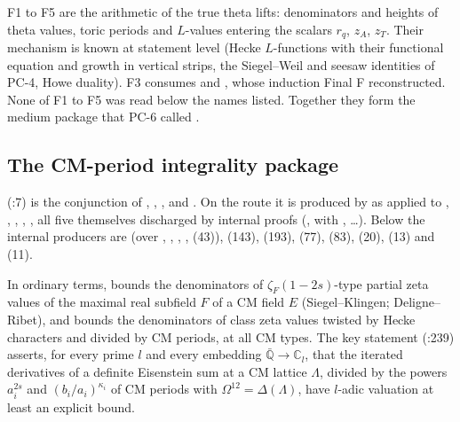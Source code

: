 \documentclass[11pt]{article}
\newcommand{\PC}[1]{\textsf{PC-#1}}
\theoremstyle{remark}
\begin{document}
F1 to F5 are the arithmetic of the true theta lifts: denominators and heights of theta values, toric periods and $L$-values entering the scalars $r_q$, $z_A$, $z_T$. Their mechanism is known at statement level (Hecke $L$-functions with their functional equation and growth in vertical strips, the Siegel--Weil and seesaw identities of \PC{4}, Howe duality). F3 consumes  and , whose induction Final F reconstructed. None of F1 to F5 was read below the names listed. Together they form the medium package that \PC{6} called .

\subsection{The CM-period integrality package }\label{sec:join}

 (:7) is the conjunction of , , ,  and . On the route it is produced by  as  applied to , , , , , all five themselves discharged by internal proofs (,  with , \dots). Below  the internal producers are  (over , , , ,  (43)),  (143),  (193),  (77),  (83),  (20),  (13) and  (11).

In ordinary terms,  bounds the denominators of $\zeta_{F}(1-2s)$-type partial zeta values of the maximal real subfield $F$ of a CM field $E$ (Siegel--Klingen; Deligne--Ribet), and  bounds the denominators of class zeta values twisted by Hecke characters and divided by CM periods, at all CM types. The key statement  (:239) asserts, for every prime $l$ and every embedding $\bar{\mathbb Q}\to\mathbb C_l$, that the iterated derivatives of a definite Eisenstein sum at a CM lattice $\Lambda$, divided by the powers $a_i^{2s}$ and $(b_i/a_i)^{\kappa_i}$ of CM periods with $\Omega^{12}=\Delta(\Lambda)$, have $l$-adic valuation at least an explicit bound.
\end{document}
